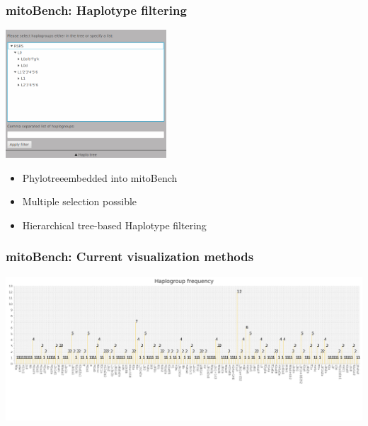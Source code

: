 \documentclass{beamer} %
\begin{document}
\begin{frame}
\frametitle{mitoBench: Haplotype filtering}

\centering
\includegraphics[width=0.45\textwidth]{imagesBench/phylotree.png}

\begin{itemize}
	\item Phylotree\footnotemark embedded into mitoBench \pause
	\item Multiple selection possible \pause
	\item Hierarchical tree-based Haplotype filtering 
\end{itemize}
\bigskip



\end{frame}


\begin{frame}
\frametitle{mitoBench: Current visualization methods}
\begin{center}
	\includegraphics[width=\textwidth]{imagesBench/barchart.png}
	\end{center}
\end{frame}
\end{document}
